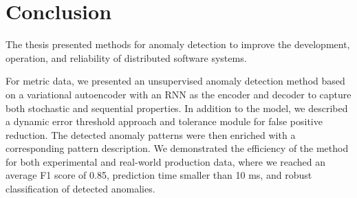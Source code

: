 
\chapter{Conclusion} %

\label{ch:conclusion} %
The thesis presented methods for anomaly detection to improve the development, operation, and reliability of distributed software systems. 

For metric data, we presented an unsupervised anomaly detection method based on a variational autoencoder with an RNN as the encoder and decoder to capture both stochastic and sequential properties. In addition to the model, we described a dynamic error threshold approach and tolerance module for false positive reduction. The detected anomaly patterns were then enriched with a corresponding pattern description. We demonstrated the efficiency of the method for both experimental and real-world production data, where we reached an average F1 score of 0.85, prediction time smaller than 10 ms, and robust classification of detected anomalies.

